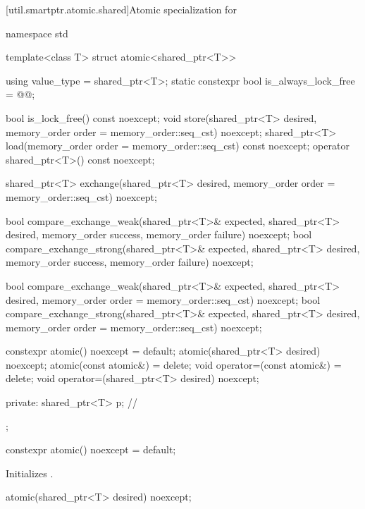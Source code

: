 [util.smartptr.atomic.shared]{Atomic specialization for }
%
\begin{codeblock}
namespace std {
  template<class T> struct atomic<shared_ptr<T>> {
    using value_type = shared_ptr<T>;
    static constexpr bool is_always_lock_free = @@;

    bool is_lock_free() const noexcept;
    void store(shared_ptr<T> desired, memory_order order = memory_order::seq_cst) noexcept;
    shared_ptr<T> load(memory_order order = memory_order::seq_cst) const noexcept;
    operator shared_ptr<T>() const noexcept;

    shared_ptr<T> exchange(shared_ptr<T> desired,
                           memory_order order = memory_order::seq_cst) noexcept;

    bool compare_exchange_weak(shared_ptr<T>& expected, shared_ptr<T> desired,
                               memory_order success, memory_order failure) noexcept;
    bool compare_exchange_strong(shared_ptr<T>& expected, shared_ptr<T> desired,
                                 memory_order success, memory_order failure) noexcept;

    bool compare_exchange_weak(shared_ptr<T>& expected, shared_ptr<T> desired,
                               memory_order order = memory_order::seq_cst) noexcept;
    bool compare_exchange_strong(shared_ptr<T>& expected, shared_ptr<T> desired,
                                 memory_order order = memory_order::seq_cst) noexcept;

    constexpr atomic() noexcept = default;
    atomic(shared_ptr<T> desired) noexcept;
    atomic(const atomic&) = delete;
    void operator=(const atomic&) = delete;
    void operator=(shared_ptr<T> desired) noexcept;

  private:
    shared_ptr<T> p;            // \expos
  };
}
\end{codeblock}

%
\begin{itemdecl}
constexpr atomic() noexcept = default;
\end{itemdecl}

\begin{itemdescr}
\pnum
\effects
Initializes .
\end{itemdescr}

%
\begin{itemdecl}
atomic(shared_ptr<T> desired) noexcept;
\end{itemdecl}


